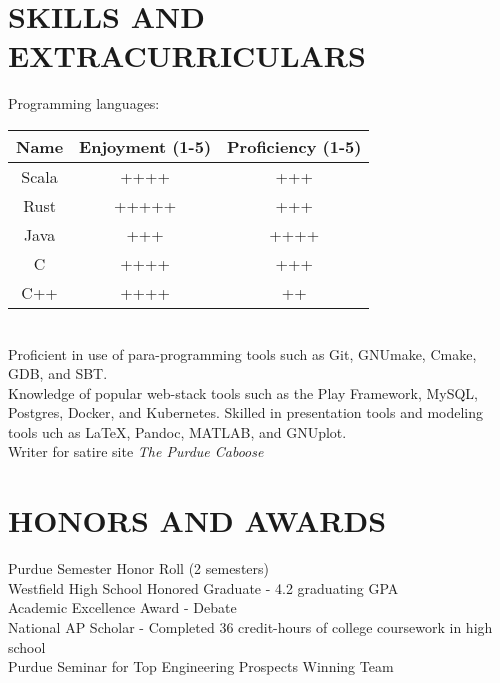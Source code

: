 \documentclass[10pt]{res}
\begin{document}
\begin{resume}
\vspace{-10pt}\section{SKILLS AND EXTRACURRICULARS}          
  Programming languages:\\
  \begin{tabular}{c | c | c}
    \hline
    Name & Enjoyment (1-5) & Proficiency (1-5) \\\hline
    Scala & ++++ & +++ \\
    Rust & +++++ & +++ \\
    Java & +++ & ++++ \\
    C & ++++ & +++ \\
    C++ & ++++ & ++ \\
    \hline
  \end{tabular}\\
	Proficient in use of para-programming tools such as Git, GNUmake, Cmake, GDB, and SBT. \\
  Knowledge of popular web-stack tools such as the Play Framework, MySQL, Postgres, Docker, and Kubernetes.
	Skilled in presentation tools and modeling tools uch as \LaTeX, Pandoc, MATLAB, and GNUplot. \\
	Writer for satire site \emph{The Purdue Caboose}
 
\vspace{-10pt}\section{HONORS AND AWARDS}          
  Purdue Semester Honor Roll (2 semesters) \\
	Westfield High School Honored Graduate - 4.2 graduating GPA \\
	Academic Excellence Award - Debate \\
	National AP Scholar - Completed 36 credit-hours of college coursework in high school \\
	Purdue Seminar for Top Engineering Prospects Winning Team \\

\end{resume}
\end{document}
